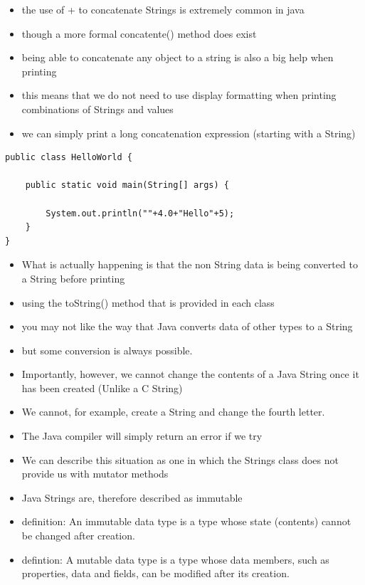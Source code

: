 \documentclass{beamer}
\begin{document}
\begin{frame}[fragile]
\begin{itemize}
\item the use of + to concatenate Strings is extremely common in java
\item though a more formal concatente() method does exist
\item being able to concatenate any object to a string is also a big help when printing
\item this means that we do not need to use display formatting when printing combinations of Strings and values
\item we can simply print a long concatenation expression (starting with a String)
\end{itemize}
\begin{block}{}
\begin{lstlisting}
public class HelloWorld {

    public static void main(String[] args) {
    
        System.out.println(""+4.0+"Hello"+5);
    }
} 
\end{lstlisting}
\end{block}
\end{frame}

\begin{frame}
\begin{itemize}
\item What is actually happening is that the non String data is being converted to a String before printing
\item using the toString() method that is provided in each class
\item you may not like the way that Java converts data of other types to a String
\item but some conversion is always possible. 
\end{itemize}
\end{frame}

\begin{frame}
\begin{itemize}
\item Importantly, however, we cannot change the contents of a Java String once it has been created (Unlike a C String)
\item We cannot, for example, create a String and change the fourth letter.
\item The Java compiler will simply return an error if we try
\item We can describe this situation as one in which the Strings class does not provide us with mutator methods
\item Java Strings are, therefore described as \alert{immutable}
\item definition: An \alert{immutable data type} is a type whose state (contents) cannot be changed after creation.
\item defintion: A \alert{mutable} data type is a type whose data members, such as properties, data and fields, can be modified after its creation.
\end{itemize}
\end{frame}
\end{document}
